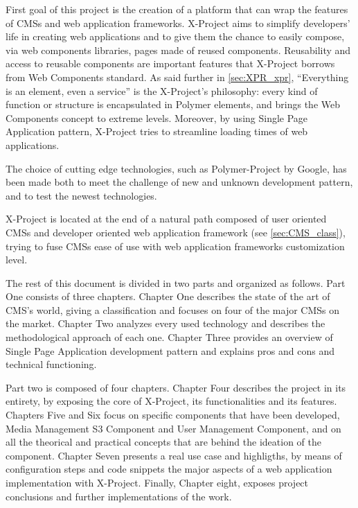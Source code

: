 First goal of this project is the creation of a platform that can wrap the features of CMSs and web application frameworks. 
X-Project aims to simplify developers' life in creating web applications and to give them the chance to easily compose, via web components libraries, pages made of reused components.
Reusability and access to reusable components are important features that X-Project borrows from Web Components standard.
As said further in \ref{sec:XPR_xpr}, ``Everything is an element, even a service'' is the X-Project's philosophy: every kind of function or structure is encapsulated in Polymer elements, and brings the Web Components concept to extreme levels. 
Moreover, by using Single Page Application pattern, X-Project tries to streamline loading times of web applications.

The choice of cutting edge technologies, such as Polymer-Project by Google, has been made both to meet the challenge of new and unknown development pattern, and to test the newest technologies.

X-Project is located at the end of a natural path composed of user oriented CMSs and developer oriented web application framework (see \ref{sec:CMS_class}), trying to fuse CMSs ease of use with web application frameworks customization level.

The rest of this document is divided in two parts and organized as follows. Part One consists of three chapters. Chapter One describes the state of the art of CMS's world, giving a classification and focuses on four of the major CMSs on the market. Chapter Two analyzes every used technology and describes the methodological approach of each one. Chapter Three provides an overview of Single Page Application development pattern and explains pros and cons and technical functioning.

Part two is composed of four chapters. Chapter Four describes the project in its entirety, by exposing the core of X-Project, its functionalities and its features.
Chapters Five and Six focus on specific components that have been developed, Media Management S3 Component and User Management Component, and on all the theorical and practical concepts that are behind the ideation of the component. 
Chapter Seven presents a real use case and highligths, by means of configuration steps and code snippets the major aspects of a web application implementation with X-Project.
Finally, Chapter eight, exposes project conclusions and further implementations of the work.



